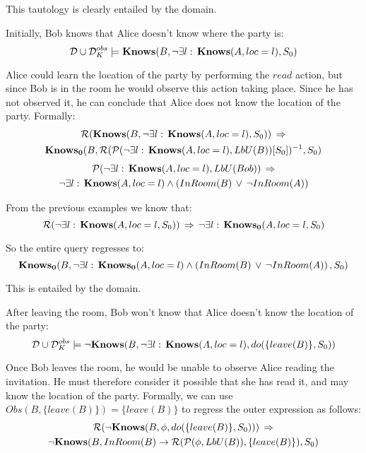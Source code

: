This tautology is clearly entailed by the domain.

\begin{example}
Initially, Bob knows that Alice doesn't know where the party is:\[
\mathcal{D}\cup\mathcal{D}_{K}^{obs}\models\mathbf{Knows}(B,\neg\exists l:\,\mathbf{Knows}(A,loc=l),S_{0})\]

\end{example}
Alice could learn the location of the party by performing the $read$
action, but since Bob is in the room he would observe this action
taking place. Since he has not observed it, he can conclude that Alice
does not know the location of the party. Formally:\begin{multline*}
\mathcal{R}(\mathbf{Knows}(B,\neg\exists l:\,\mathbf{Knows}(A,loc=l),S_{0}))\,\Rightarrow\\
\mathbf{Knows_{0}}(B,\mathcal{R}(\mathcal{P}(\neg\exists l:\,\mathbf{Knows}(A,loc=l),LbU(B))[S_{0}])^{-1},S_{0})\end{multline*}
 \begin{multline*}
\mathcal{P}(\neg\exists l:\,\mathbf{Knows}(A,loc=l),LbU(Bob))\,\Rightarrow\\
\neg\exists l:\,\mathbf{Knows}(A,loc=l)\wedge\left(InRoom(B)\,\vee\,\neg InRoom(A)\right)\end{multline*}


From the previous examples we know that:\[
\mathcal{R}(\neg\exists l:\,\mathbf{Knows}(A,loc=l,S_{0}))\,\Rightarrow\,\neg\exists l:\,\mathbf{Knows_{0}}(A,loc=l,S_{0})\]


So the entire query regresses to:\[
\mathbf{Knows_{0}}(B,\neg\exists l:\,\mathbf{Knows_{0}}(A,loc=l)\wedge\left(InRoom(B)\,\vee\,\neg InRoom(A)\right),S_{0})\]


This is entailed by the domain.

\begin{example}
After leaving the room, Bob won't know that Alice doesn't know the
location of the party:\[
\mathcal{D}\cup\mathcal{D}_{K}^{obs}\models\mathbf{\neg Knows}(B,\neg\exists l:\,\mathbf{Knows}(A,loc=l),do(\{leave(B)\},S_{0}))\]

\end{example}
Once Bob leaves the room, he would be unable to observe Alice reading
the invitation. He must therefore consider it possible that she has
read it, and may know the location of the party. Formally, we can
use $Obs(B,\{leave(B)\})=\{leave(B)\}$ to regress the outer expression
as follows:\begin{multline*}
\mathcal{R}(\neg\mathbf{Knows}(B,\phi,do(\{leave(B)\},S_{0})))\,\Rightarrow\\
\neg\mathbf{Knows}(B,InRoom(B)\rightarrow\mathcal{R}(\mathcal{P}(\phi,LbU(B)),\{leave(B)\}),S_{0})\end{multline*}


